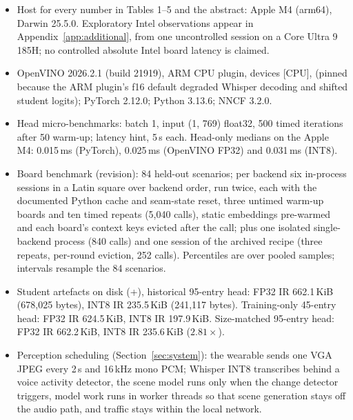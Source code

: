 \begin{itemize}
\item Host for every number in Tables 1--5 and the abstract: Apple M4 (arm64),
Darwin 25.5.0. Exploratory Intel observations appear in Appendix~\ref{app:additional}, from one uncontrolled session on a Core Ultra 9 185H;
no controlled absolute Intel board latency is claimed.
\item OpenVINO 2026.2.1 (build 21919), ARM CPU plugin, devices [CPU],
 (pinned because the ARM plugin's f16 default degraded Whisper decoding and shifted student logits); PyTorch 2.12.0; Python 3.13.6; NNCF 3.2.0.
\item Head micro-benchmarks: batch 1, input (1, 769) float32, 500 timed
iterations after 50 warm-up;  latency hint, 5\,s each. Head-only medians on the Apple M4: 0.015\,ms (PyTorch), 0.025\,ms (OpenVINO FP32) and 0.031\,ms (INT8). %
\item Board benchmark (revision): 84 held-out scenarios; per backend six in-process sessions in a Latin square over backend order, run twice, each with the documented Python cache and seam-state reset, three untimed warm-up boards and ten timed repeats (5,040 calls), static embeddings pre-warmed and each board's context keys evicted after the call; plus one isolated single-backend process (840 calls) and one session of the archived recipe (three repeats, per-round eviction, 252 calls). Percentiles are over pooled samples; intervals resample the 84 scenarios. %
\item Student artefacts on disk (+), historical 95-entry head: FP32 IR 662.1\,KiB (678,025 bytes), INT8 IR 235.5\,KiB (241,117 bytes). Training-only 45-entry head: FP32 IR 624.5\,KiB, INT8 IR 197.9\,KiB. Size-matched 95-entry head: FP32 IR 662.2\,KiB, INT8 IR 235.6\,KiB ($2.81\times$). %
\item Perception scheduling (Section~\ref{sec:system}): the wearable sends one VGA JPEG every 2\,s and 16\,kHz mono PCM; Whisper  INT8 transcribes behind a voice activity detector, the scene model runs only when the change detector triggers, model work runs in worker threads so that scene generation stays off the audio path, and traffic stays within the local network.

\end{itemize}

